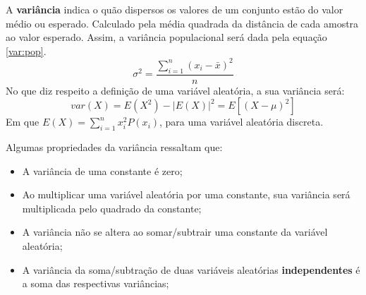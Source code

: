 A \textbf{variância} indica o quão dispersos os valores de um conjunto estão do valor médio ou esperado. Calculado pela média quadrada da distância de cada amostra ao valor esperado. Assim, a variância populacional será dada pela equação \ref{var:pop}.
\begin{equation} \label{var:pop}
    \sigma^2 = \frac{\sum_{i=1}^{n} (x_i - \bar{x})^2}{n}
\end{equation}
No que diz respeito a definição de uma variável aleatória, a sua variância será:
\begin{equation} \label{var:al}
    var(X) = E(X^2) - |E(X)|^2 = E[(X-\mu)^2]
\end{equation}
Em que $E(X) = \sum_{i=1}^{n} x_i^2P(x_i) $, para uma variável aleatória discreta.

Algumas propriedades da variância ressaltam que:
\begin{itemize}
    \item A variância de uma constante é zero;
    \item Ao multiplicar uma variável aleatória por uma constante, sua variância será multiplicada pelo quadrado da constante;
    \item A variância não se altera ao somar/subtrair uma constante da variável aleatória;
    \item A variância da soma/subtração de duas variáveis aleatórias \textbf{independentes} é a soma das respectivas variâncias;
\end{itemize}

